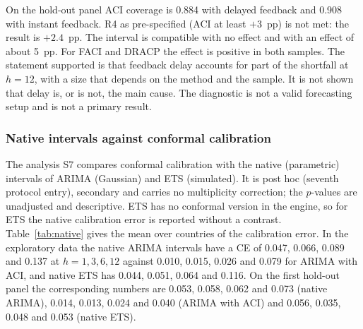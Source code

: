 \begin{table}[t]
\centering
\caption{Ablation over the feedback delay (S3): coverage at $h=12$ with delayed and with instant feedback, and the difference in pp with a 95\% paired block-bootstrap interval.}
\label{tab:feedback}
\small
\fittable{}
\end{table}

On the hold-out panel ACI coverage is 0.884 with delayed feedback and 0.908 with instant feedback. R4 as pre-specified (ACI at least $+3$~pp) is not met: the result is $+2.4$~pp. The interval  is compatible with no effect and with an effect of about 5~pp. For FACI and DRACP the effect is positive in both samples. The statement supported is that feedback delay accounts for part of the shortfall at $h=12$, with a size that depends on the method and the sample. It is not shown that delay is, or is not, the main cause. The diagnostic is not a valid forecasting setup and is not a primary result.

\subsubsection{Native intervals against conformal calibration}\label{sec:native}

The analysis S7 compares conformal calibration with the native (parametric) intervals of ARIMA (Gaussian) and ETS (simulated). It is post hoc (seventh protocol entry), secondary and carries no multiplicity correction; the $p$-values are unadjusted and descriptive. ETS has no conformal version in the engine, so for ETS the native calibration error is reported without a contrast. Table~\ref{tab:native} gives the mean over countries of the calibration error. In the exploratory data the native ARIMA intervals have a CE of 0.047, 0.066, 0.089 and 0.137 at $h=1,3,6,12$ against 0.010, 0.015, 0.026 and 0.079 for ARIMA with ACI, and native ETS has 0.044, 0.051, 0.064 and 0.116. On the first hold-out panel the corresponding numbers are 0.053, 0.058, 0.062 and 0.073 (native ARIMA), 0.014, 0.013, 0.024 and 0.040 (ARIMA with ACI) and 0.056, 0.035, 0.048 and 0.053 (native ETS).

\begin{table}[t]
\centering
\caption{Ablation over the reference interval (S7, post hoc): calibration error of native ARIMA and ETS intervals and of ARIMA with ACI, and the contrast ACI minus native (pp of CE, 95\% interval, unadjusted $p$).}
\label{tab:native}
\small
\fittable{}
\end{table}

